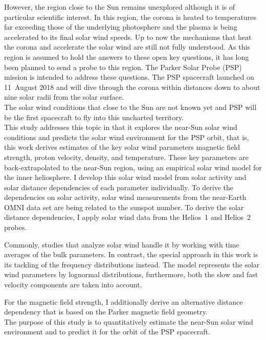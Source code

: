 However, the region close to the Sun remains unexplored although it is of particular scientific interest. In this region, the corona is heated to temperatures far exceeding those of the underlying photosphere and the plasma is being accelerated to its final solar wind speeds. Up to now the mechanisms that heat the corona and accelerate the solar wind are still not fully understood.
As this region is assumed to hold the answers to these open key questions, it has long been planned to send a probe to this region. The Parker Solar Probe (PSP) mission is intended to address these questions. The PSP spacecraft launched on 11~August 2018 and will dive through the corona within distances down to about nine solar radii from the solar surface.\\

The solar wind conditions that close to the Sun are not known yet and PSP will be the first spacecraft to fly into this uncharted territory.\\

This study addresses this topic in that it explores the near-Sun solar wind conditions and predicts the solar wind environment for the PSP orbit, that is, this work derives estimates of the key solar wind parameters magnetic field strength, proton velocity, density, and temperature. These key parameters are back-extrapolated to the near-Sun region, using an empirical solar wind model for the inner heliosphere.
I develop this solar wind model from solar activity and solar distance dependencies of each parameter individually. To derive the dependencies on solar activity, solar wind measurements from the near-Earth OMNI data set are being related to the sunspot number. To derive the solar distance dependencies, I apply solar wind data from the Helios~1 and Helios~2 probes.

Commonly, studies that analyze solar wind handle it by working with time averages of the bulk parameters. In contrast, the special approach in this work is its tackling of the frequency distributions instead. The model represents the solar wind parameters by lognormal distributions, furthermore, both the slow and fast velocity components are taken into account.

For the magnetic field strength, I additionally derive an alternative distance dependency that is based on the Parker magnetic field geometry.\\

The purpose of this study is to quantitatively estimate the near-Sun solar wind environment and to predict it for the orbit of the PSP spacecraft.

